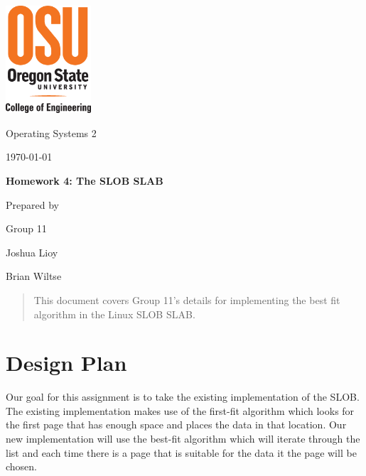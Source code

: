 \documentclass[letterpaper, onecolumn, draftclsnofoot, 10pt, compsoc]{IEEEtran}
\def \GroupNumber{11}
\def \GroupMemberOne{Joshua Lioy}
\def \GroupMemberTwo{Brian Wiltse}
\begin{document}
\begin{titlepage}
    \begin{singlespace}
    	\includegraphics[height=4cm]{coe_v_spot1}
        \hfill 
        \par\vspace{.2in}
        \centering
        \scshape{
            \huge Operating Systems 2 \par
            {\large\today}\par
            \vspace{.5in}
            \textbf{\Huge Homework 4: The SLOB SLAB}\par
            \vfill
            \vspace{5pt}
            {\large Prepared by }\par
            Group \GroupNumber\par
            \vspace{5pt}
            {\Large
                \GroupMemberOne\par
                \GroupMemberTwo\par
            }
            \vspace{20pt}
        }
        \begin{abstract}
        This document covers Group 11's details for implementing the best fit algorithm in the Linux SLOB SLAB.
        \end{abstract}     
    \end{singlespace}
\end{titlepage}

\newpage
{}
\tableofcontents

\newpage
\section{Design Plan}
    \begin{singlespace}
        Our goal for this assignment is to take the existing implementation of the SLOB. The existing implementation makes use of the first-fit algorithm which looks for the first page that has enough space and places the data in that location. Our new implementation will use the best-fit algorithm which will iterate through the list and each time there is a page that is suitable for the data it the page will be chosen.
    \end{singlespace}
    
\end{document}
